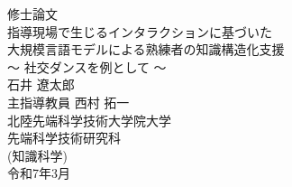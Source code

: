 \thispagestyle{empty}
\begin{center}
修士論文\\%
\vfill
指導現場で生じるインタラクションに基づいた\\
大規模言語モデルによる熟練者の知識構造化支援\\
〜 社交ダンスを例として 〜\\
\vfill
石井 遼太郎\\
\vfill
主指導教員 西村 拓一\\
\vfill
北陸先端科学技術大学院大学\\
先端科学技術研究科\\
(知識科学)\\ %
\vfill
令和7年3月\\ %
\vfill
\end{center}

\clearpage